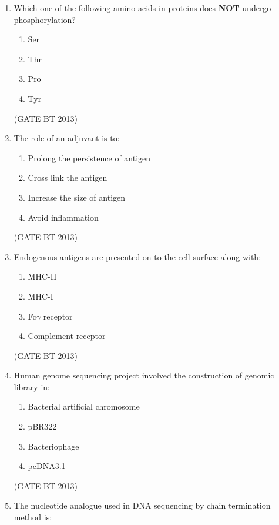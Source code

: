 \documentclass[journal,12pt,onecolumn]{IEEEtran}
\theoremstyle{remark}
\begin{document}
\begin{enumerate}
\item Which one of the following amino acids in proteins does \textbf{NOT} undergo phosphorylation?

\begin{enumerate}
    \item Ser 
    \item Thr
    \item Pro
    \item Tyr
\end{enumerate} 
\hfill (GATE BT 2013)

\item 

The role of an adjuvant is to: 

\begin{enumerate}
    
    \item Prolong the persistence of antigen
    \item Cross link the antigen
    \item Increase the size of antigen
    \item Avoid inflammation
\end{enumerate} 
\hfill (GATE BT 2013)

\item

Endogenous antigens are presented on to the cell surface along with:

\begin{enumerate}
    \item MHC-II
    \item MHC-I
    \item Fc$\gamma$ receptor
    \item Complement receptor
\end{enumerate} 
\hfill (GATE BT 2013)
\item

Human genome sequencing project involved the construction of genomic library in:

\begin{enumerate}
    \item Bacterial artificial chromosome
    \item pBR322
    \item Bacteriophage
    \item pcDNA3.1
\end{enumerate} 
\hfill (GATE BT 2013)
\item 

The nucleotide analogue used in DNA sequencing by chain termination method is:


\end{enumerate}
\end{document}

